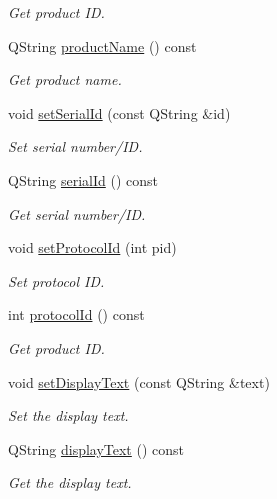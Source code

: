 \begin{DoxyCompactItemize}
\begin{DoxyCompactList}\small\item\em Get product I\-D. \end{DoxyCompactList}\item 
Q\-String \hyperlink{classmdt_device_info_afe4bbdc87acff59999905a0eeb812fe1}{product\-Name} () const 
\begin{DoxyCompactList}\small\item\em Get product name. \end{DoxyCompactList}\item 
void \hyperlink{classmdt_device_info_aeefd846da860838aa5cd70a27ac961c6}{set\-Serial\-Id} (const Q\-String \&id)
\begin{DoxyCompactList}\small\item\em Set serial number/\-I\-D. \end{DoxyCompactList}\item 
Q\-String \hyperlink{classmdt_device_info_ad9c2e69d8a7b81e25ee70dff9f7086e6}{serial\-Id} () const 
\begin{DoxyCompactList}\small\item\em Get serial number/\-I\-D. \end{DoxyCompactList}\item 
void \hyperlink{classmdt_device_info_ad90e39b5d34d4859527651cebb273e78}{set\-Protocol\-Id} (int pid)
\begin{DoxyCompactList}\small\item\em Set protocol I\-D. \end{DoxyCompactList}\item 
int \hyperlink{classmdt_device_info_a9b3a09adc91393f3c3940f41ea0bf067}{protocol\-Id} () const 
\begin{DoxyCompactList}\small\item\em Get product I\-D. \end{DoxyCompactList}\item 
void \hyperlink{classmdt_device_info_a26e8452ed2f254943225f4463ea31ef5}{set\-Display\-Text} (const Q\-String \&text)
\begin{DoxyCompactList}\small\item\em Set the display text. \end{DoxyCompactList}\item 
Q\-String \hyperlink{classmdt_device_info_ad005eb082bd00b4da0883508b64935dd}{display\-Text} () const 
\begin{DoxyCompactList}\small\item\em Get the display text. \end{DoxyCompactList}\item 

\end{DoxyCompactItemize}
